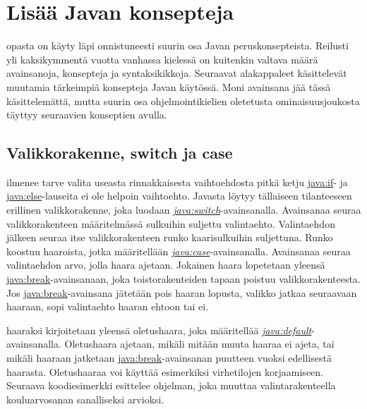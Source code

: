 \documentclass{tufte-book}
\newcommand{\java}[1]{\underline{\gls{java:#1}}}
\newcommand{\newjava}[1]{\textit{\java{#1}}}
\newcommand{\code}[3]{
\begin{listing}
    \inputminted{java}{OhjelmointiopasEsimerkit/src/#1/#2.java}
    \caption{#3}
    \label{Java-#1-#2}
\end{listing}
}
\begin{document}

\section{Lisää Javan konsepteja}
\label{loput perusteet}

 opasta on käyty läpi onnistuneesti suurin osa Javan
peruskonsepteista. Reilusti yli kaksikymmentä vuotta vanhassa kielessä on kuitenkin valtava määrä
avainsanoja, konsepteja ja syntaksikikkoja. Seuraavat alakappaleet käsittelevät muutamia
tärkeimpiä konsepteja Javan käytössä. Moni avainsana jää tässä käsittelemättä, mutta suurin osa
ohjelmointikielien oletetusta ominaisuusjoukosta täyttyy seuraavien konseptien avulla.

\subsection{Valikkorakenne, switch ja case}
\label{switch}

 ilmenee tarve valita useasta rinnakkaisesta vaihtoehdosta pitkä
ketju \java{if}- ja \java{else}-lauseita ei ole helpoin vaihtoehto. Javasta löytyy tällaiseen
tilanteeseen erillinen valikkorakenne, joka luodaan \newjava{switch}-avainsanalla. Avainsanaa
seuraa valikkorakenteen määritelmässä sulkuihin suljettu valintaehto. Valintaehdon jälkeen
seuraa itse valikkorakenteen runko kaarisulkuihin suljettuna. Runko koostuu haaroista, jotka
määritellään \newjava{case}-avainsanalla. Avainsanaa seuraa valintaehdon arvo, jolla haara
ajetaan. Jokainen haara lopetetaan yleensä \java{break}-avainsanaan, joka toistorakenteiden
tapaan poistuu valikkorakenteesta. Jos \java{break}-avainsana jätetään pois haaran lopusta,
valikko jatkaa seuraavaan haaraan, sopi valintaehto haaran ehtoon tai ei.

 haaraksi kirjoitetaan yleensä oletushaara, joka
määritellää \newjava{default}-avainsanalla. Oletushaara ajetaan, mikäli mitään muuta haaraa ei
ajeta, tai mikäli haaraan jatketaan \java{break}-avainsanan puutteen vuoksi edellisestä haarasta.
Oletushaaraa voi käyttää esimerkiksi virhetilojen korjaamiseen. Seuraava koodiesimerkki esittelee
ohjelman, joka muuttaa valintarakenteella kouluarvosanan sanalliseksi arvioksi.

\code{week3/basicexamples}{Switch}{Valikkorakenne, \java{switch}- ja \java{case} -avainsanojen
käyttö Javassa}
\end{document}
